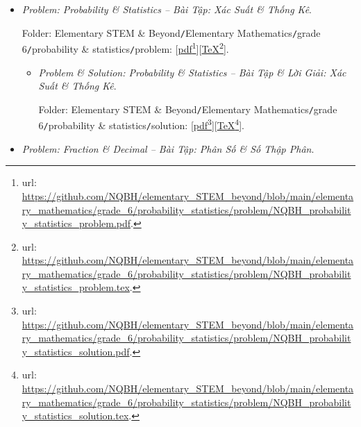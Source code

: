 \documentclass[12pt]{article}
\begin{document}
\begin{itemize}
\begin{itemize}
		Folder: {\sf Elementary STEM \& Beyond{\tt/}Elementary Mathematics{\tt/}grade 6{\tt/}visual geometry{\tt/}solution}: [\href{https://github.com/NQBH/elementary_STEM_beyond/blob/main/elementary_mathematics/grade_6/visual_geometry/problem/NQBH_visual_geometry_solution.pdf}{pdf}\footnote{{\sc url}: \url{https://github.com/NQBH/elementary_STEM_beyond/blob/main/elementary_mathematics/grade_6/visual_geometry/problem/NQBH_visual_geometry_solution.pdf}.}][\href{https://github.com/NQBH/elementary_STEM_beyond/blob/main/elementary_mathematics/grade_6/visual_geometry/problem/NQBH_visual_geometry_solution.tex}{\TeX}\footnote{{\sc url}: \url{https://github.com/NQBH/elementary_STEM_beyond/blob/main/elementary_mathematics/grade_6/visual_geometry/problem/NQBH_visual_geometry_solution.tex}.}].
	\end{itemize}
	\item {\it Problem: Probability {\it\&} Statistics -- Bài Tập: Xác Suất {\it\&} Thống Kê}.
	
	Folder: {\sf Elementary STEM \& Beyond{\tt/}Elementary Mathematics{\tt/}grade 6{\tt/}probability \& statistics{\tt/}problem}: [\href{https://github.com/NQBH/elementary_STEM_beyond/blob/main/elementary_mathematics/grade_6/probability_statistics/problem/NQBH_probability_statistics_problem.pdf}{pdf}\footnote{{\sc url}: \url{https://github.com/NQBH/elementary_STEM_beyond/blob/main/elementary_mathematics/grade_6/probability_statistics/problem/NQBH_probability_statistics_problem.pdf}.}][\href{https://github.com/NQBH/elementary_STEM_beyond/blob/main/elementary_mathematics/grade_6/probability_statistics/problem/NQBH_probability_statistics_problem.tex}{\TeX}\footnote{{\sc url}: \url{https://github.com/NQBH/elementary_STEM_beyond/blob/main/elementary_mathematics/grade_6/probability_statistics/problem/NQBH_probability_statistics_problem.tex}.}].
	\begin{itemize}
		\item {\it Problem \& Solution: Probability {\it\&} Statistics -- Bài Tập \& Lời Giải: Xác Suất {\it\&} Thống Kê}.
		
		Folder: {\sf Elementary STEM \& Beyond{\tt/}Elementary Mathematics{\tt/}grade 6{\tt/}probability \& statistics{\tt/}solution}: [\href{https://github.com/NQBH/elementary_STEM_beyond/blob/main/elementary_mathematics/grade_6/probability_statistics/problem/NQBH_probability_statistics_solution.pdf}{pdf}\footnote{{\sc url}: \url{https://github.com/NQBH/elementary_STEM_beyond/blob/main/elementary_mathematics/grade_6/probability_statistics/problem/NQBH_probability_statistics_solution.pdf}.}][\href{https://github.com/NQBH/elementary_STEM_beyond/blob/main/elementary_mathematics/grade_6/probability_statistics/problem/NQBH_probability_statistics_solution.tex}{\TeX}\footnote{{\sc url}: \url{https://github.com/NQBH/elementary_STEM_beyond/blob/main/elementary_mathematics/grade_6/probability_statistics/problem/NQBH_probability_statistics_solution.tex}.}].
	\end{itemize}	
	\item {\it Problem: Fraction \& Decimal -- Bài Tập: Phân Số {\it\&} Số Thập Phân}.
	

\end{itemize}
\end{document}
